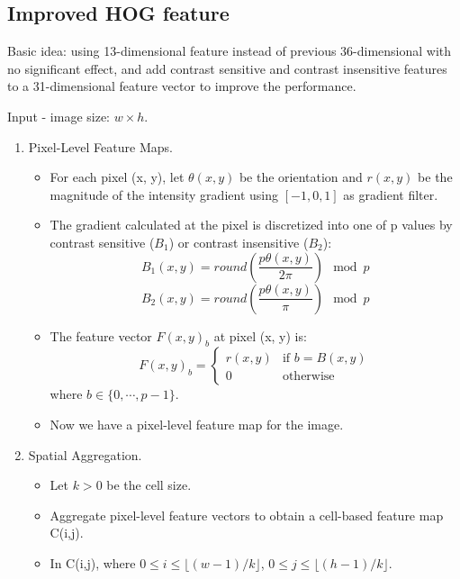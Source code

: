 \documentclass[12pt]{article}
\numberwithin{equation}{section}
\begin{document}
\subsection{Improved HOG feature \citep{felzenszwalb2010object}}
Basic idea: using 13-dimensional feature instead of previous 36-dimensional with no significant effect, and
add  contrast sensitive and contrast insensitive features to a 31-dimensional feature vector to improve the 
performance. \par
Input - image size: $w \times h$.
\begin{enumerate}
	\item Pixel-Level Feature Maps. 
		\begin{itemize}
			\item For each pixel (x, y), let $\theta(x,y)$ be the orientation and $r(x,y)$ be the magnitude of 
			the intensity gradient using $[-1, 0, 1]$ as gradient filter.
			\item The gradient calculated at the pixel is discretized into one of p values by contrast sensitive
			($B_1$) or contrast insensitive ($B_2$):
				\begin{equation}
					B_1(x,y) = round(\frac{p \theta(x,y)}{2 \pi})\mod p 
				\end{equation}
				\begin{equation}
					B_2(x,y) = round(\frac{p \theta(x,y)}{\pi})\mod p
				\end{equation}
			\item The feature vector $F(x, y)_b$ at pixel (x, y) is: 
				\begin{equation}
					F(x,y)_b=
					\begin{cases}
						r(x,y) & \text{if } b = B(x,y) \\
						0 & \text{otherwise}
    					\end{cases}
				\end{equation}
			where $b \in \{0, \cdots , p-1 \}$.
			\item Now we have a pixel-level feature map for the image.
		\end{itemize}
	\item Spatial Aggregation.
		\begin{itemize}
			\item Let $k > 0$ be the cell size.
			\item Aggregate pixel-level feature vectors to obtain a cell-based feature map C(i,j).
			\item In C(i,j), where $0 \le i \le \lfloor{(w-1)/k}\rfloor$, $0 \le j \le \lfloor{(h-1)/k}\rfloor$.

\end{itemize}
\end{enumerate}
\end{document}
